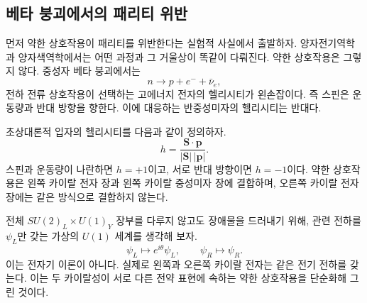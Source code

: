\subsection{베타 붕괴에서의 패리티 위반}

먼저 약한 상호작용이 패리티를 위반한다는 실험적 사실에서 출발하자. 양자전기역학과 양자색역학에서는 어떤 과정과 그 거울상이 똑같이 다뤄진다. 약한 상호작용은 그렇지 않다. 중성자 베타 붕괴에서는
\begin{equation}
  n\longrightarrow p+e^-+\bar\nu_e,
  \label{eq:l09-beta-decay}
\end{equation}
전하 전류 상호작용이 선택하는 고에너지 전자의 헬리시티가 왼손잡이다. 즉 스핀은 운동량과 반대 방향을 향한다. 이에 대응하는 반중성미자의 헬리시티는 반대다.

초상대론적 입자의 헬리시티를 다음과 같이 정의하자.
\begin{equation}
  h=\frac{\bm S\cdot\bm p}{|\bm S|\,|\bm p|}.
\end{equation}
스핀과 운동량이 나란하면 \(h=+1\)이고, 서로 반대 방향이면 \(h=-1\)이다. 약한 상호작용은 왼쪽 카이랄 전자 장과 왼쪽 카이랄 중성미자 장에 결합하며, 오른쪽 카이랄 전자 장에는 같은 방식으로 결합하지 않는다.

전체 \(SU(2)_L\times U(1)_Y\) 장부를 다루지 않고도 장애물을 드러내기 위해, 관련 전하를 \(\psi_L\)만 갖는 가상의 \(U(1)\) 세계를 생각해 보자.
\begin{equation}
  \psi_L\longmapsto e^{i\theta}\psi_L,
  \qquad
  \psi_R\longmapsto\psi_R .
  \label{eq:l09-chiral-toy-charge}
\end{equation}
이는 전자기 이론이 아니다. 실제로 왼쪽과 오른쪽 카이랄 전자는 같은 전기 전하를 갖는다. 이는 두 카이랄성이 서로 다른 전약 표현에 속하는 약한 상호작용을 단순화해 그린 것이다.

\begin{classroomqa}\end{classroomqa}

